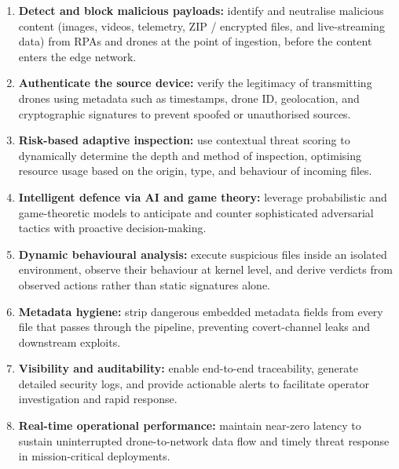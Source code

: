 \documentclass[12pt, a4paper]{report}
\begin{document}
\begin{enumerate}
    \item \textbf{Detect and block malicious payloads:} identify and
          neutralise malicious content (images, videos, telemetry, ZIP /
          encrypted files, and live-streaming data) from RPAs and drones at
          the point of ingestion, before the content enters the edge network.

    \item \textbf{Authenticate the source device:} verify the legitimacy of
          transmitting drones using metadata such as timestamps, drone ID,
          geolocation, and cryptographic signatures to prevent spoofed or
          unauthorised sources.

    \item \textbf{Risk-based adaptive inspection:} use contextual threat
          scoring to dynamically determine the depth and method of
          inspection, optimising resource usage based on the origin, type,
          and behaviour of incoming files.

    \item \textbf{Intelligent defence via AI and game theory:} leverage
          probabilistic and game-theoretic models to anticipate and counter
          sophisticated adversarial tactics with proactive decision-making.

    \item \textbf{Dynamic behavioural analysis:} execute suspicious files
          inside an isolated environment, observe their behaviour at kernel
          level, and derive verdicts from observed actions rather than
          static signatures alone.

    \item \textbf{Metadata hygiene:} strip dangerous embedded metadata fields
          from every file that passes through the pipeline, preventing
          covert-channel leaks and downstream exploits.

    \item \textbf{Visibility and auditability:} enable end-to-end
          traceability, generate detailed security logs, and provide
          actionable alerts to facilitate operator investigation and rapid
          response.

    \item \textbf{Real-time operational performance:} maintain near-zero
          latency to sustain uninterrupted drone-to-network data flow and
          timely threat response in mission-critical deployments.
\end{enumerate}
\end{document}
